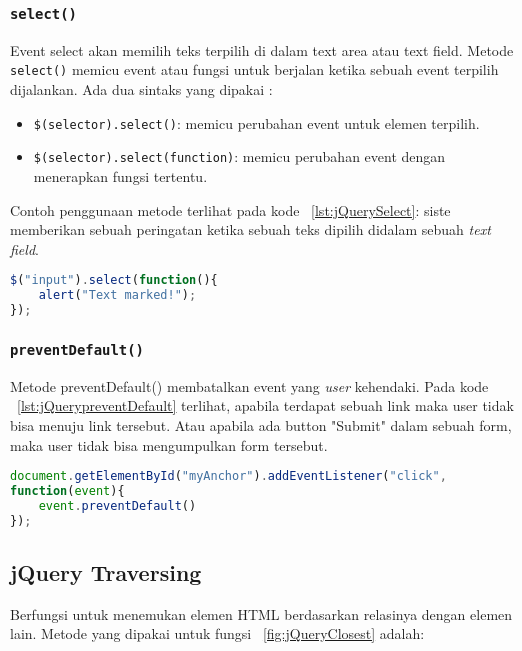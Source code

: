 \subsubsection{\texttt{select()}}
Event select akan memilih teks terpilih di dalam text area atau text field.
Metode \texttt{select()} memicu event atau fungsi untuk berjalan ketika sebuah event terpilih dijalankan.
Ada dua sintaks yang dipakai :
\begin{itemize}
	\item \texttt{\$(selector).select()}: memicu perubahan event untuk elemen terpilih.
	\item \texttt{\$(selector).select(function)}: memicu perubahan event dengan menerapkan fungsi tertentu.
\end{itemize}
Contoh penggunaan metode terlihat pada kode ~\ref{lst:jQuerySelect}: siste memberikan sebuah peringatan ketika sebuah teks dipilih didalam sebuah \textit{text field}.
\begin{lstlisting}[style=JavaScript, language=JavaScript,  basicstyle=\ttfamily, frame=single, columns=fullflexible, keepspaces=true, breaklines=true, showstringspaces=false, label={lst:jQuerySelect}, caption=jQuery Selector.]
$("input").select(function(){
	alert("Text marked!");
});
\end{lstlisting}

\subsubsection{\texttt{preventDefault()}}
Metode preventDefault() membatalkan event yang \textit{user} kehendaki. Pada kode ~\ref{lst:jQuerypreventDefault} terlihat, apabila terdapat sebuah link maka user tidak bisa menuju link tersebut. Atau apabila ada button "Submit" dalam sebuah form, maka user tidak bisa mengumpulkan form tersebut.
\begin{lstlisting}[style=JavaScript, language=JavaScript,  basicstyle=\ttfamily, frame=single, columns=fullflexible, keepspaces=true, breaklines=true, showstringspaces=false, label={lst:jQuerypreventDefault}, caption=jQuery preventDefault().]
document.getElementById("myAnchor").addEventListener("click", 
function(event){
	event.preventDefault()
});
\end{lstlisting}


\subsection{jQuery Traversing}
Berfungsi untuk menemukan elemen HTML berdasarkan relasinya dengan elemen lain. Metode yang dipakai untuk fungsi ~\ref{fig:jQueryClosest} adalah:
